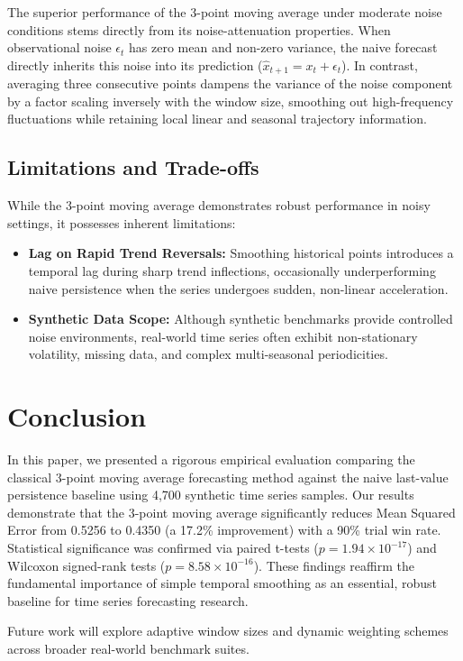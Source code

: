 \documentclass[10pt,letterpaper]{article}
\begin{document}
The superior performance of the 3-point moving average under moderate noise conditions stems directly from its noise-attenuation properties. When observational noise $\epsilon_t$ has zero mean and non-zero variance, the naive forecast directly inherits this noise into its prediction ($\hat{x}_{t+1} = x_t + \epsilon_t$). In contrast, averaging three consecutive points dampens the variance of the noise component by a factor scaling inversely with the window size, smoothing out high-frequency fluctuations while retaining local linear and seasonal trajectory information.

\subsection{Limitations and Trade-offs}

While the 3-point moving average demonstrates robust performance in noisy settings, it possesses inherent limitations:
\begin{itemize}
  \item \textbf{Lag on Rapid Trend Reversals:} Smoothing historical points introduces a temporal lag during sharp trend inflections, occasionally underperforming naive persistence when the series undergoes sudden, non-linear acceleration.
  \item \textbf{Synthetic Data Scope:} Although synthetic benchmarks provide controlled noise environments, real-world time series often exhibit non-stationary volatility, missing data, and complex multi-seasonal periodicities.
\end{itemize}

\section{Conclusion}

In this paper, we presented a rigorous empirical evaluation comparing the classical 3-point moving average forecasting method against the naive last-value persistence baseline using 4,700 synthetic time series samples. Our results demonstrate that the 3-point moving average significantly reduces Mean Squared Error from 0.5256 to 0.4350 (a 17.2\% improvement) with a 90\% trial win rate. Statistical significance was confirmed via paired t-tests ($p = 1.94 \times 10^{-17}$) and Wilcoxon signed-rank tests ($p = 8.58 \times 10^{-16}$). These findings reaffirm the fundamental importance of simple temporal smoothing as an essential, robust baseline for time series forecasting research.

Future work will explore adaptive window sizes and dynamic weighting schemes across broader real-world benchmark suites.



\end{document}
